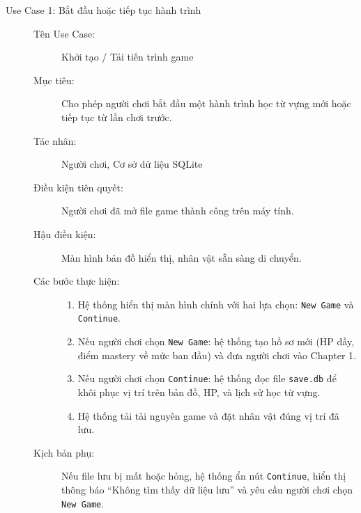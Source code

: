 \begin{description}
    \item[Use Case 1: Bắt đầu hoặc tiếp tục hành trình] \hfill
    \begin{description}
        \item[Tên Use Case:] Khởi tạo / Tải tiến trình game
        \item[Mục tiêu:] Cho phép người chơi bắt đầu một hành trình học từ vựng mới hoặc tiếp tục từ lần chơi trước.
        \item[Tác nhân:] Người chơi, Cơ sở dữ liệu SQLite
        \item[Điều kiện tiên quyết:] Người chơi đã mở file game thành công trên máy tính.
        \item[Hậu điều kiện:] Màn hình bản đồ hiển thị, nhân vật sẵn sàng di chuyển.
        \item[Các bước thực hiện:] \hfill
        \begin{enumerate}
            \item Hệ thống hiển thị màn hình chính với hai lựa chọn: \texttt{New Game} và \texttt{Continue}.
            \item Nếu người chơi chọn \texttt{New Game}: hệ thống tạo hồ sơ mới (HP đầy, điểm mastery về mức ban đầu) và đưa người chơi vào Chapter 1.
            \item Nếu người chơi chọn \texttt{Continue}: hệ thống đọc file \texttt{save.db} để khôi phục vị trí trên bản đồ, HP, và lịch sử học từ vựng.
            \item Hệ thống tải tài nguyên game và đặt nhân vật đúng vị trí đã lưu.
        \end{enumerate}
        \item[Kịch bản phụ:] Nếu file lưu bị mất hoặc hỏng, hệ thống ẩn nút \texttt{Continue}, hiển thị thông báo ``Không tìm thấy dữ liệu lưu'' và yêu cầu người chơi chọn \texttt{New Game}.
    \end{description}

    \vspace{0.3cm} %


\end{description}
